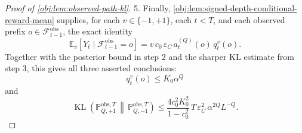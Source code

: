 \begin{proof}[Proof of \cref{obj:lem:observed-path-kl}]
5.  Finally, \cref{obj:lem:signed-depth-conditional-reward-mean} supplies, for each \(v\in\{-1,+1\}\), each \(t<T\), and each observed prefix \(o\in\mathcal F_{t-1}^{\mathrm{obs}}\), the exact identity
\[
\mathbb E_v[Y_t\mid \mathcal F_{t-1}^{\mathrm{obs}}=o]
=
v\,c_0\,\varepsilon_C\,a_t^{(Q)}(o)\,q_t^v(o).
\]
Together with the posterior bound in step 2 and the sharper KL estimate from step 3, this gives all three asserted conclusions:
\[
q_t^v(o)\le K_0\alpha^Q
\]
and
\[
\operatorname{KL}\!\left(
\mathbb P_{Q,+1}^{\mathrm{obs},T}
\,\middle\|\,
\mathbb P_{Q,-1}^{\mathrm{obs},T}
\right)
\le
\frac{4c_0^2K_0^2}{1-c_0^2}\,
T\,\varepsilon_C^2\,\alpha^{2Q}L^{-Q}.
\] %
\end{proof}
